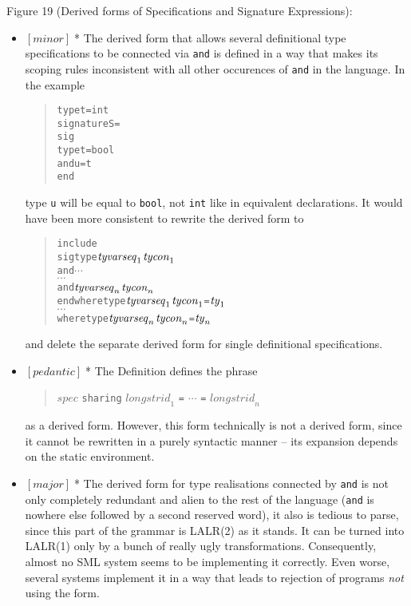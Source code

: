 \documentclass{article}
\newcommand{\m}[1]{$[\mathit{#1}]\;$}
\newcommand{\major}{\m{major}}
\newcommand{\minor}{\m{minor}}
\newcommand{\pedantic}{\m{pedantic}}
\begin{document}
Figure 19 (Derived forms of Specifications and Signature Expressions):
\nopagebreak

\begin{itemize}
\item \minor * The derived form that allows several definitional type specifications to be connected via {\tt and} is defined in a way that makes its scoping rules inconsistent with all other occurences of {\tt and} in the language. In the example
\begin{quote}
\begin{alltt}
type t = int
signature S =
sig
    type t = bool
    and  u = t
end
\end{alltt}
\end{quote}
type {\tt u} will be equal to {\tt bool}, not {\tt int} like in equivalent declarations. It would have been more consistent to rewrite the derived form to
\begin{quote}
\begin{alltt}
include
  sig type \(\mathit{tyvarseq}\sb{1}\) \(\mathit{tycon}\sb{1}\)
       and \(\cdots\)
       \(\cdots\)
       and \(\mathit{tyvarseq}\sb{n}\) \(\mathit{tycon}\sb{n}\)
  end where type \(\mathit{tyvarseq}\sb{1}\) \(\mathit{tycon}\sb{1}\) = \(\mathit{ty}\sb{1}\)
      \(\cdots\)
      where type \(\mathit{tyvarseq}\sb{n}\) \(\mathit{tycon}\sb{n}\) = \(\mathit{ty}\sb{n}\)
\end{alltt}
\end{quote}
and delete the separate derived form for single definitional specifications.

\item \pedantic * The Definition defines the phrase
\begin{quote}
$\mathit{spec}$ {\tt sharing} $\mathit{longstrid}_1$ {\tt =} $\cdots$ {\tt =} $\mathit{longstrid}_n$
\end{quote}
as a derived form. However, this form technically is not a derived form, since it cannot be rewritten in a purely syntactic manner -- its expansion depends on the static environment.

\item \major * The derived form for type realisations connected by {\tt and} is not only completely redundant and alien to the rest of the language ({\tt and} is nowhere else followed by a second reserved word), it also is tedious to parse, since this part of the grammar is LALR(2) as it stands. It can be turned into LALR(1) only by a bunch of really ugly transformations. Consequently, almost no SML system seems to be implementing it correctly. Even worse, several systems implement it in a way that leads to rejection of programs {\em not} using the form.
\end{itemize}
\end{document}
